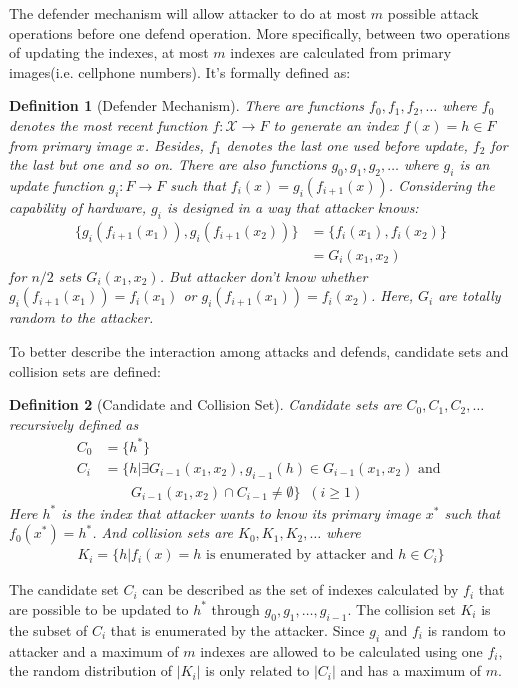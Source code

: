 \documentclass[10pt, conference, compsocconf]{IEEEtran}
\newtheorem{mydef}{Definition}
\begin{document}
		The defender mechanism will allow attacker to do at most $m$ possible
		attack operations before one defend operation. More specifically, between
		two operations of updating the indexes,
		at most $m$ indexes are calculated from primary images(i.e. cellphone numbers).
		It's formally defined as:
		\begin{mydef}[Defender Mechanism]
			There are functions $f_0, f_1, f_2, \ldots$ where
			$f_0$ denotes the most recent function $f: \mathcal{X} \rightarrow F$
			to generate an index $f(x) = h \in F$ from primary image $x$. 
			Besides, $f_1$ denotes the last one used before update, $f_2$ for the last but one and so on.
			There are also functions $g_0, g_1, g_2, \ldots$ where
			$g_i$ is an update function $g_i: F \rightarrow F$ such that
			$f_i(x) = g_i(f_{i+1}(x))$. Considering the capability of hardware,
			$g_i$ is designed in a way that attacker knows:
			\begin{align*}
				\{g_i(f_{i+1}(x_1)), g_i(f_{i+1}(x_2))\} &= \{ f_i(x_1), f_i(x_2)\}\\
					 &= G_i(x_1, x_2)
			\end{align*}
			for $n/2$ sets $G_i(x_1, x_2)$.
			But attacker don't know whether $g_i(f_{i+1}(x_1)) = f_i(x_1)$ or
			$g_i(f_{i+1}(x_1)) = f_i(x_2)$. 
			Here, $G_i$ are totally random
			to the attacker.
		\end{mydef}
		
		To better describe the interaction among attacks
		and defends, candidate sets and collision sets are defined:
		\begin{mydef}[Candidate and Collision Set]
			Candidate sets are $C_0, C_1, C_2, \ldots$ recursively defined as
			\begin{align*}
				C_0 &= \{h^*\}\\
				C_i &= \{h | \exists G_{i-1}(x_1, x_2),
					g_{i-1}(h) \in G_{i-1}(x_1, x_2) \text{ and } \\
					& \;\;\;\;\;\;\; G_{i-1}(x_1, x_2) \cap C_{i-1} \neq \emptyset \} \;\;(i \geq 1)
			\end{align*}
			Here $h^*$ is the index that attacker wants to know its primary image
			$x^*$ such that $f_0(x^*) = h^*$. And collision sets are $K_0, K_1, K_2, \ldots$ where
			\begin{align*}
				K_i = \{h | f_i(x) = h \text{ is enumerated by attacker and } h \in C_i \}
			\end{align*}
		\end{mydef}
		
		The candidate set $C_i$ can be described as the set of indexes 
		calculated by $f_i$ that are possible to be
		updated to $h^*$ through $g_0, g_1, \ldots, g_{i-1}$. The collision set $K_i$ is the
		subset of $C_i$ that is enumerated by the attacker. Since $g_i$ and $f_i$ is random
		to attacker and a maximum of $m$ indexes are allowed to be calculated using one $f_i$, 
		the random distribution of $|K_i|$ is only related to $|C_i|$ and has a maximum
		of $m$. 
		
\end{document}
